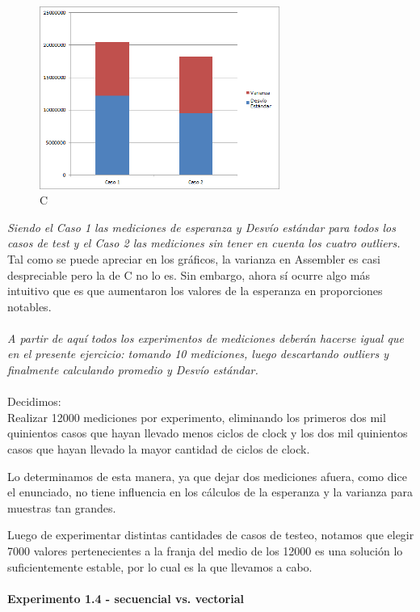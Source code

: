 \newpage
\begin{figure}[h!]
  \begin{center}
	\includegraphics[width=0.7\textwidth]{imagenes/perdidaC}
	\caption{C}
  \end{center}
\end{figure}

\indent \textit{Siendo el Caso 1 las mediciones de esperanza y Desvío est\'andar para todos los casos de test y el Caso 2 las mediciones sin tener en cuenta los cuatro outliers.}\\

Tal como se puede apreciar en los gr\'aficos, la varianza en Assembler es casi despreciable pero la de C no lo es. Sin embargo, ahora s\'i ocurre algo m\'as intuitivo que es que aumentaron los valores de la esperanza en proporciones notables. \\
\\

 \bigskip
\textit{A partir de aquí todos los experimentos de mediciones deberán hacerse igual 
que en el presente ejercicio: tomando 10 mediciones, luego descartando 
outliers y finalmente calculando promedio y Desvío est\'andar.}\\
\\
Decidimos: \\

Realizar 12000 mediciones por experimento, eliminando los primeros dos mil quinientos casos que hayan llevado menos ciclos de clock y los dos mil quinientos casos que hayan llevado la mayor cantidad de ciclos de clock. 

Lo determinamos de esta manera, ya que dejar dos mediciones afuera, como dice el enunciado, no tiene influencia en los c\'alculos de la esperanza y la varianza para muestras tan grandes. 

Luego de experimentar distintas cantidades de casos de testeo, notamos que elegir 7000 valores pertenecientes a la franja del medio de los 12000 es una soluci\'on lo suficientemente estable, por lo cual es la que llevamos a cabo. \\
\\
\newpage
\noindent\textbf{Experimento 1.4 - secuencial vs. vectorial}

